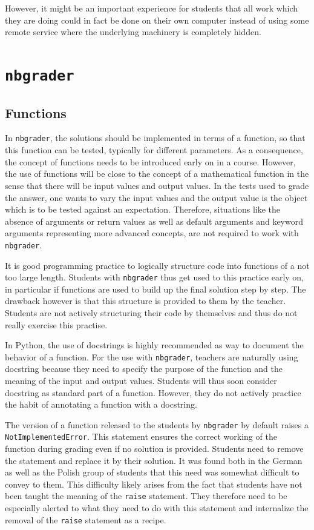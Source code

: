 \documentclass[twocolumn]{svjour3}          %
\begin{document}
However, it might be an important experience for students that all
work which they are doing could in fact be done on their own computer
instead of using some remote service where the underlying machinery is
completely hidden.

\section{\texttt{nbgrader}}

\subsection{Functions}

In \texttt{nbgrader}, the solutions should be implemented in terms of a
function, so that this function can be tested, typically for different
parameters. As a consequence, the concept of functions needs to be introduced
early on in a course. However, the use of functions will be close to the
concept of a mathematical function in the sense that there will be input values
and output values. In the tests used to grade the answer, one wants to vary the
input values and the output value is the object which is to be tested against
an expectation. Therefore, situations like the absence of arguments or return
values as well as default arguments and keyword arguments representing more
advanced concepts, are not required to work with \texttt{nbgrader}.

It is good programming practice to logically structure code into functions of a
not too large length. Students with \texttt{nbgrader} thus get used to this
practice early on, in particular if functions are used to build up the final
solution step by step. The drawback however is that this structure is provided
to them by the teacher. Students are not actively structuring their code by
themselves and thus do not really exercise this practise.

In Python, the use of docstrings is highly recommended as way to document
the behavior of a function. For the use with \texttt{nbgrader}, teachers are
naturally using docstring because they need to specify the purpose of the
function and the meaning of the input and output values. Students will thus
soon consider docstring as standard part of a function. However, they do not
actively practice the habit of annotating a function with a docstring.

The version of a function released to the students by \texttt{nbgrader} by
default raises a \texttt{NotImplementedError}. This statement ensures the
correct working of the function during grading even if no solution is provided.
Students need to remove the statement and replace it by their solution. It was
found both in the German as well as the Polish group of students that this need
was somewhat difficult to convey to them. This difficulty likely arises from
the fact that students have not been taught the meaning of the \texttt{raise}
statement. They therefore need to be especially alerted to what they need to do
with this statement and internalize the removal of the \texttt{raise} statement
as a recipe.
\end{document}
